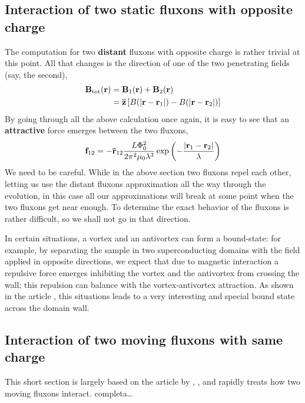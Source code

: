 \subsection{Interaction of two static fluxons with opposite charge}

The computation for two \textbf{distant} fluxons with opposite charge is rather trivial at this point. All that changes is the direction of one of the two penetrating fields (say, the second),
\[
\begin{aligned}
	\mathbf{B}_\mathrm{tot}(\mathbf{r}) &= \mathbf{B}_1(\mathbf{r}) + \mathbf{B}_2(\mathbf{r}) \\
	&= \mathbf{\bar{z}} \left[{B(\abs{\mathbf{r}-\mathbf{r}_1})-B(\abs{\mathbf{r}-\mathbf{r}_2})}\right]
\end{aligned}
\]
By going through all the above calculation once again, it is easy to see that an \textbf{attractive} force emerges between the two fluxons,
\[
	\mathbf{f}_{12} = -\mathbf{\bar{r}}_{12} \frac{L \Phi_0^2}{2\pi^2\mu_0 \lambda^3} \exp \left({- \frac{\abs{\mathbf{r}_1-\mathbf{r}_2}}{\lambda} }\right)
\]
We need to be careful. While in the above section two fluxons repel each other, letting us use the distant fluxons approximation all the way through the evolution, in this case all our approximations will break at some point when the two fluxons get near enough. To determine the exact behavior of the fluxons is rather difficult, so we shall not go in that direction.

In certain situations, a vortex and an antivortex can form a bound-state: for example, by separating the sample in two superconducting domains with the field applied in opposite directions, we expect that due to magnetic interaction a repulsive force emerges inhibiting the vortex and the antivortex from crossing the wall; this repulsion can balance with the vortex-antivortex attraction. As shown in the article  \cite{Simmendinger_2020}, this situations leads to a very interesting and special bound state across the domain wall.

\subsection{Interaction of two moving fluxons with same charge}

This short section is largely based on the article by \citeauthor{PhysRevB.102.024506},  \cite{PhysRevB.102.024506}, and rapidly treats how two moving fluxons interact. {\color{red}completa\dots}

